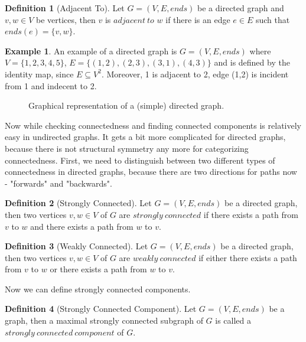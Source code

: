 \documentclass{report}
\theoremstyle{plain}
\theoremstyle{definition}
\newtheorem{definition}{Definition}
\newtheorem{example}{Example}
\theoremstyle{remark}
\numberwithin{definition}{chapter}
\numberwithin{example}{chapter}
\numberwithin{figure}{chapter}
\numberwithin{theorem}{chapter}
\numberwithin{lemma}{chapter}
\begin{document}
\begin{definition}[Adjacent To]
Let $G = (V, E, ends)$ be a directed graph and $v,w\in V$ be vertices, then $v$ is $adjacent \ to$ $w$ if there is an edge $ e \in E$ such that $ends(e) = \{v, w\}$.
\end{definition}

\begin{example}
An example of a directed graph is $G=(V, E, ends)$ where $V=\{1,2,3,4,5\}$, $E=\{(1,2), (2,3), (3,1), (4,3)\}$ and is defined by the identity map, since $E \subseteq V^2$. Moreover, 1 is adjacent to 2, edge (1,2) is incident from 1 and indecent to 2.

\begin{figure}[h]
\center
{}
\caption{Graphical representation of a (simple) directed graph.}
\end{figure}
\end{example}

Now while checking connectedness and finding connected components is relatively easy in undirected graphs. It gets a bit more complicated for directed graphs, because there is not structural symmetry any more for categorizing connectedness. First, we need to distinguish between two different types of connectedness in directed graphs, because there are two directions for paths now - "forwards" and "backwards".

\begin{definition}[Strongly Connected]
Let $G = (V, E, ends)$ be a directed graph, then two vertices $v, w \in V$ of $G$ are $strongly \ connected$ if there exists a path from $v$ to $w$ and there exists a path from $w$ to $v$.
\end{definition}

\begin{definition}[Weakly Connected]
Let $G = (V, E, ends)$ be a directed graph, then two vertices $v, w \in V$ of $G$ are $weakly \ connected$ if either there exists a path from $v$ to $w$ or there exists a path from $w$ to $v$.
\end{definition}

Now we can define strongly connected components.

\begin{definition}[Strongly Connected Component]
Let $G = (V, E, ends)$ be a graph, then a maximal strongly connected subgraph of $G$ is called a $strongly \ connected \ component$ of $G$.
\end{definition}
\end{document}
